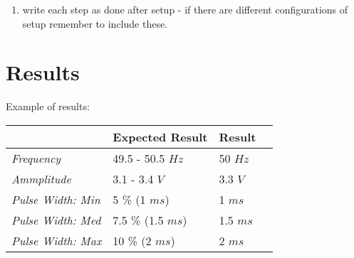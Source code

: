\begin{enumerate}
\item write each step as done after setup - if there are different configurations of setup remember to include these.
\end{enumerate}

\section*{Results}

Example of results:
\begin{table}[H]
\begin{tabular}{|l|l|l|l|}

\hline%
           & \textbf{Expected Result}   & \textbf{Result} \\
\hline%
  \textit{Frequency}           &  49.5 - 50.5 $Hz$ &  50 $Hz$  \\
\hline%
\textit{Ammplitude}                     &   3.1 - 3.4 $V$            &    3.3 $V$          \\
\hline%
 \textit{Pulse Width: Min}     &    5 \% (1 $ms$)          &     1  $ms$   \\
\hline%
\textit{Pulse Width: Med}      &      7.5 \% (1.5 $ms$)           & 1.5 $ms$            \\
\hline%
  \textit{Pulse Width: Max}   &    10 \% (2 $ms$)             &  2 $ms$         \\
\hline%

\end{tabular}
\end{table}
